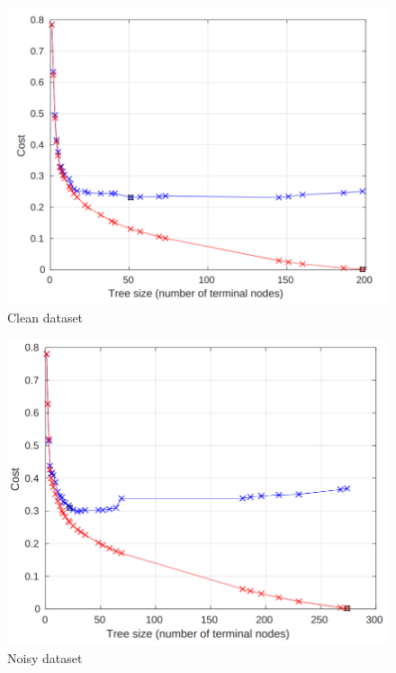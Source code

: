 \begin{figure}[h]
    \caption{Clean dataset}
    \begin{center}
  \includegraphics[scale = 0.40]{graphs/clean_dataset/clean_pruning.png}
 \end{center}
  \end{figure}


 \begin{figure}[h]
    \begin{center}
    \caption{Noisy dataset}
  \includegraphics[scale = 0.40]{graphs/noisy_dataset/noisy_pruning.png} 
 \end{center}

  \end{figure}

